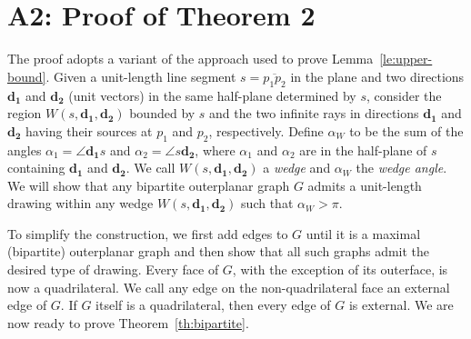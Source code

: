 \documentclass[orivec]{llncs}
\begin{document}
\section*{A2: Proof of Theorem 2}
The proof adopts a variant of the approach used to prove Lemma~\ref{le:upper-bound}.
Given a unit-length line segment $s=\overline{p_1 p_2}$ in the plane and two directions  $\mathbf{d_1}$ and  $\mathbf{d_2}$ (unit vectors) in the same half-plane determined by $s$,
consider the region  $W(s,\mathbf{d_1}, \mathbf{d_2})$
bounded by $s$ and the two infinite rays in directions $\mathbf{d_1}$ and  $\mathbf{d_2}$
having their sources at $p_1$ and $p_2$, respectively.
Define $\alpha_W$ to be the sum of the angles $\alpha_1 = \angle \mathbf{d_1} s$ and
$\alpha_2 = \angle s \mathbf{d_2}$, where $\alpha_1$ and $\alpha_2$ are in the half-plane of $s$ containing $\mathbf{d_1}$ and $\mathbf{d_2}$.
We call $W(s,\mathbf{d_1}, \mathbf{d_2})$ a {\em wedge} and $\alpha_W$ the
{\em wedge angle}.
We will show that any bipartite outerplanar graph $G$ admits a unit-length drawing within any wedge
$W(s,\mathbf{d_1}, \mathbf{d_2})$ such that $\alpha_W > \pi$.

To simplify the construction, we first add edges to $G$ until it is a maximal (bipartite)
outerplanar graph and then show that all such graphs admit the desired type of drawing.
Every face of $G$, with the exception of its outerface, is now a quadrilateral.
We call any edge on the non-quadrilateral face an external edge of $G$.
If $G$ itself is a quadrilateral, then every edge of $G$
is external. We are now ready to prove Theorem~\ref{th:bipartite}.
\end{document}
